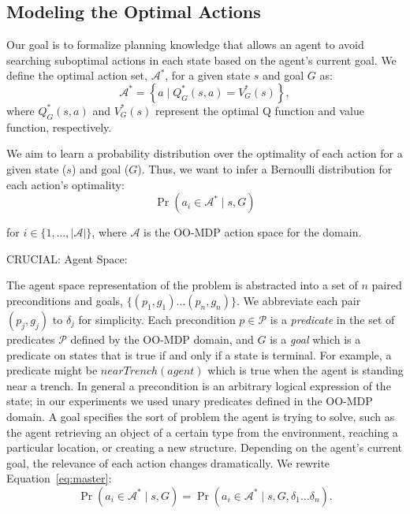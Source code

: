 \documentclass[11pt]{article}
\begin{document}
\subsection{Modeling the Optimal Actions}

Our goal is to formalize planning knowledge that allows an agent to
avoid searching suboptimal actions in each state based on the agent's
current goal. We define the optimal action set, $\mathcal{A}^*$, for a
given state $s$ and goal $G$ as:
\begin{equation}
\mathcal{A}^* = \left\{ a \mid Q^*_G(s,a) = V^*_G(s) \right\}, 
\label{eq:opt_act_set}
\end{equation}
where $Q^*_G(s,a)$ and $V^*_G(s)$ represent the optimal Q function and 
value function, respectively.

We aim to learn a probability distribution over the optimality of each action
for a given state ($s$) and goal ($G$). Thus, we want to infer a Bernoulli
distribution for each action's optimality:
\begin{equation}
\Pr(a_i \in \mathcal{A}^* \mid s, G)
\label{eq:master}
\end{equation}

\noindent for $i \in \{1, \ldots, |\mathcal{A}|\}$, where
$\mathcal{A}$ is the OO-MDP action space for the domain.

CRUCIAL: Agent Space:

The agent space representation of the problem is abstracted
into a set of $n$ paired preconditions and goals, $\{
(p_1, g_1) \ldots (p_{n}, g_{n}) \}$. We abbreviate each pair $(p_j,
g_j)$ to $\delta_j$ for simplicity. Each precondition $p \in
\mathcal{P}$ is a {\it predicate} in the set of predicates $\mathcal{P}$
defined by the OO-MDP domain, and $G$ is a {\it goal} which is a
predicate on states that is true if and only if a state is terminal. For example, a
predicate might be $nearTrench(agent)$ which is true when the agent is
standing near a trench.  In general a precondition is an arbitrary
logical expression of the state; in our experiments we used unary
predicates defined in the OO-MDP domain. A goal specifies the
sort of problem the agent is trying to solve, such as the agent
retrieving an object of a certain type from the environment, reaching
a particular location, or creating a new structure.  Depending on the
agent's current goal, the relevance of each action changes
dramatically.  We rewrite Equation~\ref{eq:master}:
\begin{equation}
\Pr(a_i \in \mathcal{A}^* \mid s, G) = \Pr(a_i \in \mathcal{A}^* \mid s, G, \delta_1 \ldots \delta_n).
\end{equation}
\end{document}
